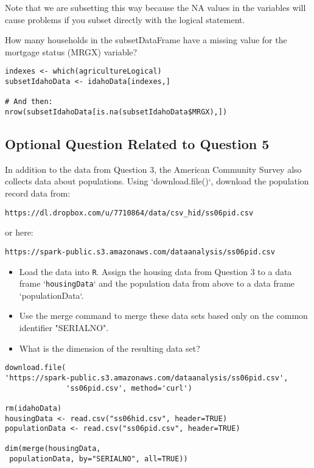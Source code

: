 \documentclass[]{article}
\begin{document}
\noindent Note that we are subsetting this way because the NA values in the variables 
will cause problems if you subset directly with the logical statement. 


\noindent How many households in the subsetDataFrame have a missing value for the mortgage status 
(MRGX) variable?

\begin{framed} 
\begin{verbatim}
indexes <- which(agricultureLogical)
subsetIdahoData <- idahoData[indexes,]

# And then:
nrow(subsetIdahoData[is.na(subsetIdahoData$MRGX),])
\end{verbatim}
\end{framed} 

\newpage
\subsection*{Optional Question Related to Question 5}

In addition to the data from Question 3, the American Community Survey also collects data about populations. 
Using `download.file()`, download the population record data from: 

\begin{verbatim}
https://dl.dropbox.com/u/7710864/data/csv_hid/ss06pid.csv 
\end{verbatim}
or here:
\begin{verbatim}
https://spark-public.s3.amazonaws.com/dataanalysis/ss06pid.csv
\end{verbatim}

\begin{itemize}
\item Load the data into \texttt{R}. Assign the housing data from Question 3 to a data frame `\texttt{housingData}` and the population data from above to a data frame `populationData`.

\item Use the merge command to merge these data sets based only on the common identifier "SERIALNO". 

\item What is the dimension of the resulting data set? 
\end{itemize}

\begin{framed} 
\begin{verbatim}
download.file(
'https://spark-public.s3.amazonaws.com/dataanalysis/ss06pid.csv',
              'ss06pid.csv', method='curl')

rm(idahoData)
housingData <- read.csv("ss06hid.csv", header=TRUE)
populationData <- read.csv("ss06pid.csv", header=TRUE)

dim(merge(housingData, 
 populationData, by="SERIALNO", all=TRUE))
\end{verbatim}
\end{framed} 

\end{document}
